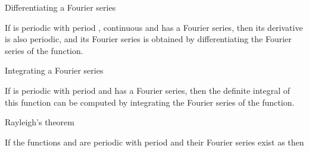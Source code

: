 \EMhold


\begin{EMtheorem}{Differentiating a Fourier series}

If  is periodic with period , continuous and has a Fourier series, then its derivative is also periodic, and its Fourier series is obtained by differentiating the Fourier series of the function.

\end{EMtheorem}

\begin{EMtheorem}{Integrating a Fourier series}

If  is periodic with period  and has a Fourier series, then the definite integral of this function can be computed by integrating the Fourier series of the function.

\end{EMtheorem}

\EMhold


\begin{EMtheorem}{Rayleigh's theorem}

If the functions  and  are periodic with period  and their Fourier series exist as
then

\end{EMtheorem}

